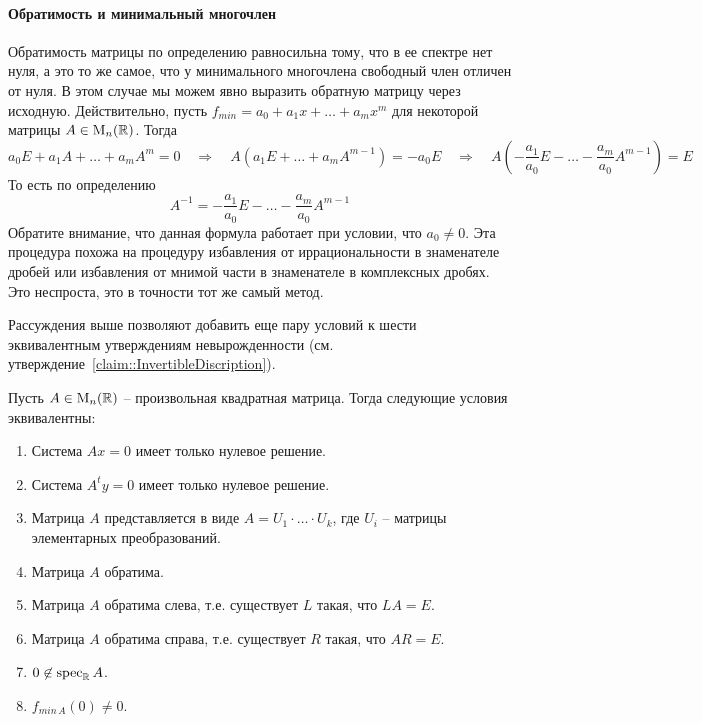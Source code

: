 \paragraph{Обратимость и минимальный многочлен}

Обратимость матрицы по определению равносильна тому, что в ее спектре нет нуля, а это то же самое, что у минимального многочлена свободный член отличен от нуля.
В этом случае мы можем явно выразить обратную матрицу через исходную.
Действительно, пусть $f_{min} = a_0 + a_1 x + \ldots + a_m x^m$ для некоторой матрицы $A\in \operatorname{M}_{n}(\mathbb R)$.
Тогда
\[
a_0E + a_1 A + \ldots + a_m A^m =  0 \quad\Rightarrow\quad  A (a_1 E + \ldots + a_m A^{m-1}) =  -a_0 E \quad\Rightarrow\quad A \left(-\frac{a_1}{a_0} E - \ldots -\frac{ a_m}{a_0} A^{m-1}\right) = E
\]
То есть по определению
\[
A^{-1} = -\frac{a_1}{a_0} E - \ldots -\frac{ a_m}{a_0} A^{m-1}
\]
Обратите внимание, что данная формула работает при условии, что $a_0 \neq 0$.
Эта процедура похожа на процедуру избавления от иррациональности в знаменателе дробей или избавления от мнимой части в знаменателе в комплексных дробях.
Это неспроста, это в точности тот же самый метод.

Рассуждения выше позволяют добавить еще пару условий к шести эквивалентным утверждениям невырожденности (см. утверждение~\ref{claim::InvertibleDiscription}).

\begin{claim}
\label{claim::InvertibleDiscriptionEight}
Пусть $A\in\operatorname{M}_{n}(\mathbb R)$ -- произвольная квадратная матрица.
Тогда следующие условия эквивалентны:
\begin{enumerate}
\item Система $Ax = 0$ имеет только нулевое решение.

\item Система $A^ty = 0$ имеет только нулевое решение.

\item Матрица $A$ представляется в виде $A = U_1\cdot \ldots \cdot U_k$, где $U_i$ -- матрицы элементарных преобразований.

\item Матрица $A$ обратима.

\item Матрица $A$ обратима слева, т.е. существует $L$ такая, что $LA = E$.

\item Матрица $A$ обратима справа, т.е. существует $R$ такая, что $AR = E$.

\item $0\not\in \operatorname{spec}_\mathbb R A$.

\item $f_{min\, A}(0)\neq 0$.
\end{enumerate}
\end{claim}


